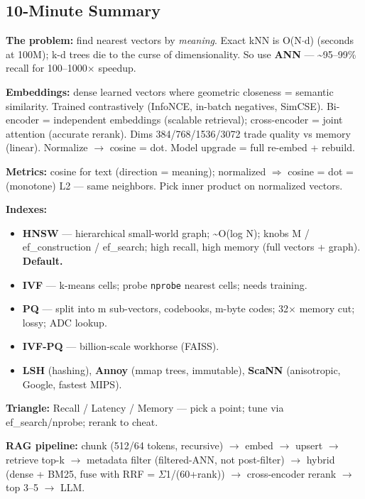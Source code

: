 \documentclass[11pt]{article}
\providecommand{\tightlist}{\setlength{\itemsep}{1pt}\setlength{\parskip}{0pt}}
\begin{document}
\subsection{10-Minute Summary}\label{10-minute-summary}

\textbf{The problem:} find nearest vectors by \emph{meaning}. Exact kNN is O(N\(\cdot\)d) (seconds at 100M); k-d trees die to the curse of dimensionality. So use \textbf{ANN} --- \textasciitilde95--99\% recall for 100--1000\(\times\) speedup.

\textbf{Embeddings:} dense learned vectors where geometric closeness = semantic similarity. Trained contrastively (InfoNCE, in-batch negatives, SimCSE). Bi-encoder = independent embeddings (scalable retrieval); cross-encoder = joint attention (accurate rerank). Dims 384/768/1536/3072 trade quality vs memory (linear). Normalize \(\rightarrow\) cosine = dot. Model upgrade = full re-embed + rebuild.

\textbf{Metrics:} cosine for text (direction = meaning); normalized \(\Rightarrow\) cosine = dot = (monotone) L2 --- same neighbors. Pick inner product on normalized vectors.

\textbf{Indexes:}

\begin{itemize}
\tightlist
\item
  \textbf{HNSW} --- hierarchical small-world graph; \textasciitilde O(log N); knobs M / ef\_construction / ef\_search; high recall, high memory (full vectors + graph). \textbf{Default.}
\item
  \textbf{IVF} --- k-means cells; probe \texttt{nprobe} nearest cells; needs training.
\item
  \textbf{PQ} --- split into m sub-vectors, codebooks, m-byte codes; 32\(\times\) memory cut; lossy; ADC lookup.
\item
  \textbf{IVF-PQ} --- billion-scale workhorse (FAISS).
\item
  \textbf{LSH} (hashing), \textbf{Annoy} (mmap trees, immutable), \textbf{ScaNN} (anisotropic, Google, fastest MIPS).
\end{itemize}

\textbf{Triangle:} Recall / Latency / Memory --- pick a point; tune via ef\_search/nprobe; rerank to cheat.

\textbf{RAG pipeline:} chunk (512/64 tokens, recursive) \(\rightarrow\) embed \(\rightarrow\) upsert \(\rightarrow\) retrieve top-k \(\rightarrow\) metadata filter (filtered-ANN, not post-filter) \(\rightarrow\) hybrid (dense + BM25, fuse with RRF = \(\Sigma\)1/(60+rank)) \(\rightarrow\) cross-encoder rerank \(\rightarrow\) top 3--5 \(\rightarrow\) LLM.
\end{document}
